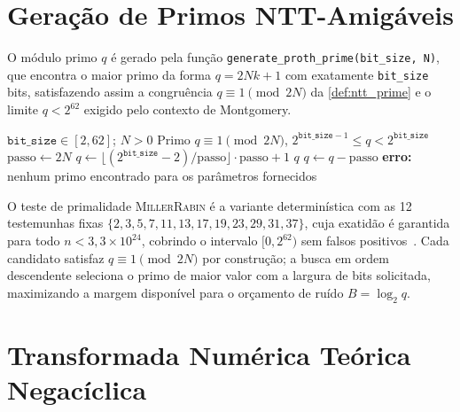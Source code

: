\documentclass[11pt,a4paper]{report}
\begin{document}
\chapter{Geração de Primos NTT-Amigáveis}
\label{cap:primes}

O módulo primo $q$ é gerado pela função \texttt{generate\_proth\_prime(bit\_size, N)},
que encontra o maior primo da forma $q = 2Nk + 1$ com exatamente \texttt{bit\_size} bits,
satisfazendo assim a congruência $q \equiv 1 \pmod{2N}$ da \cref{def:ntt_prime} e
o limite $q < 2^{62}$ exigido pelo contexto de Montgomery.

\begin{algorithm}[ht]
\caption{\texttt{generate\_proth\_prime}: primo NTT-amigável de tamanho fixo}
\label{alg:prime_gen}
\begin{algorithmic}[1]
\Require $\texttt{bit\_size} \in [2, 62]$;\; $N > 0$
\Ensure Primo $q \equiv 1 \pmod{2N}$,\; $2^{\texttt{bit\_size}-1} \leq q < 2^{\texttt{bit\_size}}$
\State $\text{passo} \gets 2N$
\State $q \gets \lfloor (2^{\texttt{bit\_size}} - 2) / \text{passo} \rfloor
       \cdot \text{passo} + 1$
    \State \Return $q$
  \EndIf
  \State $q \gets q - \text{passo}$
\EndWhile
\State \textbf{erro:} nenhum primo encontrado para os parâmetros fornecidos
\end{algorithmic}
\end{algorithm}

O teste de primalidade \textsc{MillerRabin} é a variante determinística com as 12
testemunhas fixas $\{2, 3, 5, 7, 11, 13, 17, 19, 23, 29, 31, 37\}$, cuja exatidão
é garantida para todo $n < 3{,}3 \times 10^{24}$, cobrindo o intervalo $[0, 2^{62})$
sem falsos positivos~\cite{Pomerance1980}. Cada candidato satisfaz
$q \equiv 1 \pmod{2N}$ por construção; a busca em ordem descendente seleciona o primo
de maior valor com a largura de bits solicitada, maximizando a margem disponível para o
orçamento de ruído $B = \log_2 q$.

\chapter{Transformada Numérica Teórica Negacíclica}
\label{cap:ntt}
\end{document}
